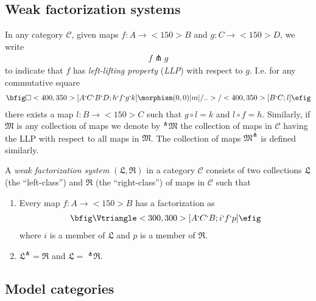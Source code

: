 \documentclass{amsart}
\theoremstyle{definition}
\theoremstyle{remark}
\begin{document}
\subsection{Weak factorization systems}

In any category $\mathcal{C}$, given maps $f:A\to<150>B$ and $g:C\to<150>D$, we write 
\begin{align*}
  f\pitchfork g
\end{align*}
to indicate that $f$ has \emph{left-lifting property} (\emph{LLP}) with respect to
$g$.  I.e. for any commutative square
\begin{align*}
  \bfig
  \square<400,350>[A`C`B`D;h`f`g`k]
  \morphism(0,0)|m|/..>/<400,350>[B`C;l]
  \efig
\end{align*}
there exists a map $l:B\to<150>C$ such that $g\circ l=k$ and $l\circ
f=h$.  Similarly, if $\mathfrak{M}$ is any collection of maps we denote by
$^{\pitchfork}\mathfrak{M}$ the collection of maps in
$\mathcal{C}$ having the LLP with respect to all maps in $\mathfrak{M}$.
The collection of maps $\mathfrak{M}^{\pitchfork}$ is defined similarly.

A \emph{weak factorization system} $(\mathfrak{L},\mathfrak{R})$ in a category
$\mathcal{C}$ consists of two collections $\mathfrak{L}$ (the
``left-class'') and
$\mathfrak{R}$ (the ``right-class'') of maps in $\mathcal{C}$ such that 
\begin{enumerate}
\item Every map $f:A\to<150>B$ has a factorization as
  \begin{align*}
    \bfig
    \Vtriangle<300,300>[A`C`B;i`f`p]
    \efig
  \end{align*}
  where $i$ is a member of $\mathfrak{L}$ and $p$ is a member of $\mathfrak{R}$.
\item $\mathfrak{L}^{\pitchfork}=\mathfrak{R}$ and $\mathfrak{L}=\;^{\pitchfork}\mathfrak{R}$.
\end{enumerate}

\subsection{Model categories}
\end{document}
